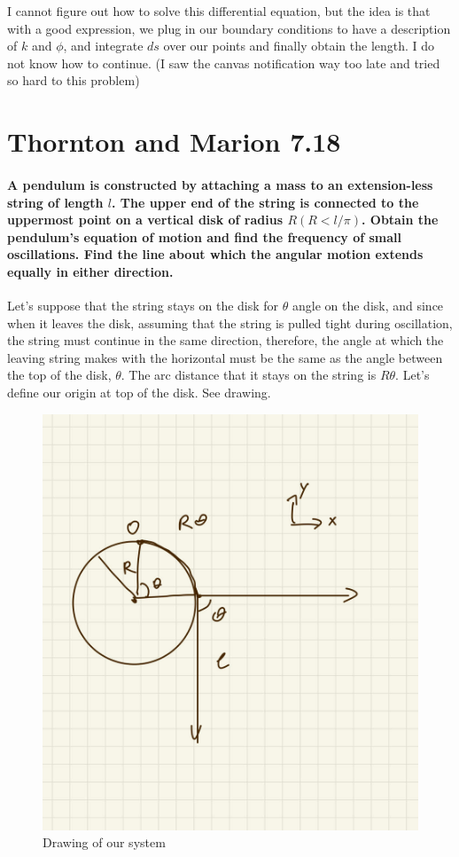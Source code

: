 \documentclass{article}
\numberwithin{equation}{section}
\begin{document}
I cannot figure out how to solve this differential equation, but the idea is that with a good expression, we plug in our boundary conditions to have a description of $k$ and $\phi$, and integrate $ds$ over our points and finally obtain the length. I do not know how to continue. (I saw the canvas notification way too late and tried so hard to this problem)

\section{Thornton and Marion 7.18} 
\paragraph{A pendulum is constructed by attaching a mass to an extension-less string of length $l$. The upper end of the string is connected to the uppermost point on a vertical disk of radius $R(R < l/ \pi)$. Obtain the pendulum’s equation of motion and find the frequency of small oscillations. Find the line about which the angular motion extends equally in either direction.\\}

Let's suppose that the string stays on the disk for $\theta$ angle on the disk, and since when it leaves the disk, assuming that the string is pulled tight during oscillation, the string must continue in the same direction, therefore, the angle at which the leaving string makes with the horizontal must be the same as the angle between the top of the disk, $\theta$. The arc distance that it stays on the string is $R \theta$. Let's define our origin at top of the disk. See drawing.

\begin{figure}[!htb]
\centering
   \begin{minipage}{0.48\textwidth}
     \includegraphics[width=.7\linewidth]{hw/hw1/4.1.jpg}
     \caption{Drawing of our system}
   \end{minipage}\hfill
\end{figure}
\end{document}
